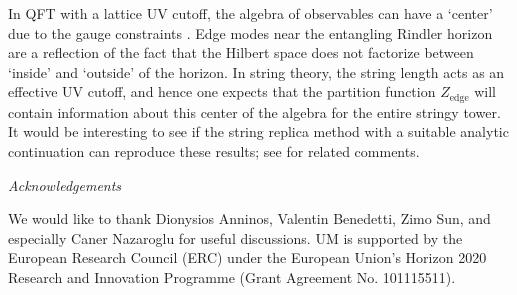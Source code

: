 \documentclass[aps,prl, reprint, superscriptaddress, 10pt]{revtex4-2}
\newcommand{\1}{\textbf{1}}
\newcommand{\+}{{\,+ \,}}
\begin{document}
In QFT with a lattice UV cutoff, the algebra of observables can have a `center' due to the gauge constraints \cite{Buividovich:2008gq,Casini:2013rba,Ghosh:2015iwa,Moitra:2018lxn}. Edge modes near the entangling Rindler horizon are a reflection of the fact that the Hilbert space does not factorize between `inside' and `outside' of the horizon. In string theory, the string length acts as an effective UV cutoff, and hence one expects that the partition function $Z_{\text{edge}}$ will contain information about this center of the algebra for the entire stringy tower. It would be interesting to see if the string replica method \cite{Dabholkar:1994ai} with a suitable analytic continuation \cite{Dabholkar:2023ows} can reproduce these results; see \cite{Dabholkar:2024neq} for related comments.

\newpage
\vspace{1em}
\centerline{\textit{Acknowledgements}}
\vspace{1em}
We would like to thank Dionysios Anninos, Valentin Benedetti, Zimo Sun, and especially Caner Nazaroglu for useful discussions. UM is supported by the European Research Council (ERC) under the European Union’s Horizon 2020 Research and Innovation Programme (Grant Agreement No. 101115511).





\end{document}
